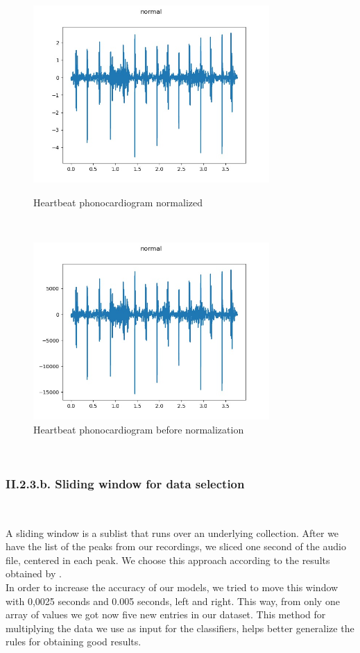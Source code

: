 \documentclass[11pt, a4papper]{report}
\theoremstyle{plain}
\theoremstyle{definition}
\theoremstyle{definition}
\theoremstyle{proposition}
\begin{document}
\begin{figure}[H]
\includegraphics[width=9cm]{img/normal__113_1306244002866_D.jpg}
\centering
\caption{Heartbeat phonocardiogram normalized}
\

\includegraphics[width=9cm]{img/beforenorm/normal__113_1306244002866_D.jpg}
\centering
\caption{Heartbeat phonocardiogram before normalization}
\end{figure}
\


\subsubsection*{II.2.3.b. Sliding window for data selection}

\

A sliding window is a sublist that runs over an underlying collection. After we have the list of the peaks from our recordings, we sliced one second of the audio file, centered in each peak. We choose this approach according to the results obtained by \cite{14}.
\\

In order to increase the accuracy of our models, we tried to move this window with 0,0025 seconds and 0.005 seconds, left and right. This way, from only one array of values we got now five new entries in our dataset. This method for multiplying the data we use as input for the classifiers, helps better generalize the rules for obtaining good results. \cite{19}
\end{document}
